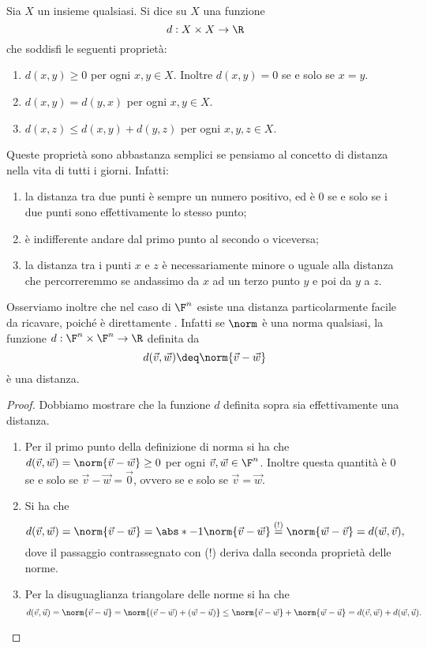 \begin{definition}
    [Distanza]
    Sia $X$ un insieme qualsiasi. Si dice  su $X$ una funzione \[
        d : X \times X \to \R
    \] che soddisfi le seguenti proprietà:
    \begin{enumerate}[(1)]
        \item $d(x, y) \geq 0$ per ogni $x, y \in X$. Inoltre $d(x, y) = 0$ se e solo se $x = y$.
        \item $d(x, y) = d(y, x)$ per ogni $x, y \in X$.
        \item $d(x, z) \leq d(x, y) + d(y, z)$ per ogni $x, y, z \in X$.  
    \end{enumerate}
\end{definition}

Queste proprietà sono abbastanza semplici se pensiamo al concetto di distanza nella vita di tutti i giorni. Infatti:
\begin{enumerate}[(1)]
    \item la distanza tra due punti è sempre un numero positivo, ed è $0$ se e solo se i due punti sono effettivamente lo stesso punto;
    \item è indifferente andare dal primo punto al secondo o viceversa;
    \item la distanza tra i punti $x$ e $z$ è necessariamente minore o uguale alla distanza che percorreremmo se andassimo da $x$ ad un terzo punto $y$ e poi da $y$ a $z$.
\end{enumerate}

Osserviamo inoltre che nel caso di $\F^n$ esiste una distanza particolarmente facile da ricavare, poiché è direttamente . Infatti se $\norm$ è una norma qualsiasi, la funzione $d : \F^n \times \F^n \to \R$ definita da \[
    d(\vec v, \vec w) \deq \norm{\vec v - \vec w}
\] è una distanza.
\begin{proof}
    Dobbiamo mostrare che la funzione $d$ definita sopra sia effettivamente una distanza.
    \begin{enumerate}[(1)]
        \item Per il primo punto della definizione di norma si ha che $d(\vec v, \vec w) = \norm{\vec v - \vec w} \geq 0$ per ogni $\vec v, \vec w \in \F^n$. Inoltre questa quantità è $0$ se e solo se $\vec v - \vec w = \vec 0$, ovvero se e solo se $\vec v = \vec w$.
        \item Si ha che \[
            d(\vec v, \vec w)
            = \norm{\vec v - \vec w}
            = \abs*{-1}\norm{\vec v - \vec w}
            \stackrel{(!)}{=} \norm{\vec w - \vec v}
            = d(\vec w, \vec v),
        \] dove il passaggio contrassegnato con (!) deriva dalla seconda proprietà delle norme.
        \item Per la disuguaglianza triangolare delle norme si ha che \[
            d(\vec v, \vec u)
            = \norm{\vec v - \vec u}
            = \norm{(\vec v - \vec w) + (\vec w - \vec u)}
            \leq \norm{\vec v - \vec w} + \norm{\vec w - \vec u}
            = d(\vec v, \vec w) + d(\vec w, \vec u). \qedhere
        \]
    \end{enumerate}
\end{proof}

